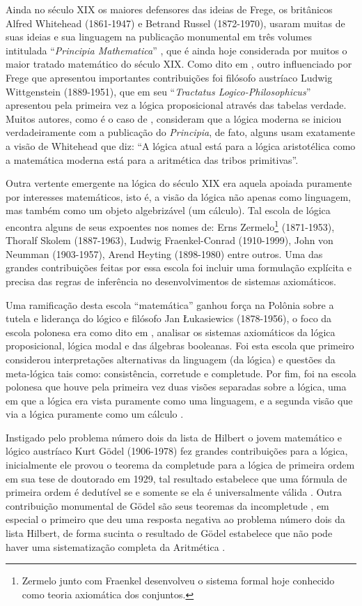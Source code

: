 Ainda no século XIX os maiores defensores das ideias de Frege, os britânicos Alfred Whitehead (1861-1947) e Betrand Russel (1872-1970),  usaram muitas de suas ideias e sua linguagem na publicação monumental em três volumes intitulada ``\textit{Principia Mathematica}'' \cite{russel1910principia}, que é ainda hoje considerada por muitos o maior tratado matemático do século XIX. Como dito em \cite{BenjaV1}, outro influenciado por Frege que apresentou importantes contribuições foi filósofo austríaco Ludwig Wittgenstein (1889-1951), que em seu ``\textit{Tractatus Logico-Philosophicus}'' apresentou pela primeira vez a lógica proposicional através das tabelas verdade. Muitos autores, como é o caso de \cite{abe2002-logica}, consideram que a lógica moderna se iniciou verdadeiramente com a publicação do \textit{Principia}, de fato, alguns usam exatamente a visão de Whitehead que diz: ``A lógica atual está para a lógica aristotélica como a matemática moderna está para a aritmética das tribos primitivas''.

Outra vertente emergente na lógica do século XIX era aquela apoiada puramente por interesses matemáticos, isto é, a visão da lógica não apenas como linguagem, mas também como um objeto algebrizável (um cálculo). Tal escola de lógica encontra alguns de seus expoentes nos nomes de: Erns Zermelo\footnote{Zermelo junto com Fraenkel desenvolveu o sistema formal hoje conhecido como teoria axiomática dos conjuntos.} (1871-1953), Thoralf Skolem (1887-1963), Ludwig Fraenkel-Conrad (1910-1999), John von Neumman (1903-1957), Arend Heyting (1898-1980) entre outros. Uma das grandes contribuições feitas por essa escola foi incluir uma formulação explícita e precisa das regras de inferência no desenvolvimentos de sistemas axiomáticos.

Uma ramificação desta escola ``matemática'' ganhou força na Polônia sobre a tutela e liderança do lógico e filósofo Jan \L{}ukasiewics (1878-1956), o foco da escola polonesa era como dito em \cite{BenjaV1}, analisar os sistemas axiomáticos da lógica proposicional, lógica modal e das álgebras booleanas. Foi esta escola que primeiro considerou interpretações alternativas da linguagem (da lógica) e questões da meta-lógica tais como: consistência, corretude e completude. Por fim, foi na escola polonesa que houve pela primeira vez duas visões separadas sobre a lógica, uma em que a lógica era vista puramente como uma linguagem, e a segunda visão que via a lógica puramente como um cálculo \cite{BenjaV1}.

Instigado pelo problema número dois da lista de Hilbert o jovem matemático e lógico austríaco Kurt Gödel (1906-1978) fez grandes contribuições para a lógica, inicialmente ele provou o teorema da completude para a lógica de primeira ordem em sua tese de doutorado em 1929, tal resultado estabelece que uma fórmula de primeira ordem é dedutível se e somente se ela é universalmente válida \cite{BenjaV1}. Outra contribuição monumental de Gödel são seus teoremas da incompletude \cite{godel1931}, em especial o primeiro que deu uma resposta negativa ao problema número dois da lista Hilbert, de forma sucinta o resultado de Gödel estabelece que não pode haver uma sistematização completa da Aritmética  \cite{abe2002-logica}.

